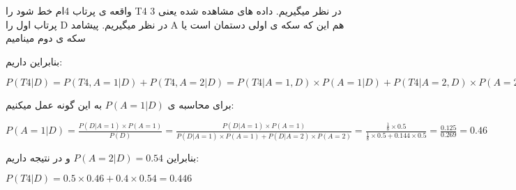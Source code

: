 واقعه ی پرتاب 4ام خط شود را T4 در نظر میگیریم. 
داده های مشاهده شده یعنی 3 پرتاب اول را D در نظر میگیریم. 
پیشامد A هم این که سکه ی اولی دستمان است یا سکه ی دوم مینامیم 

بنابراین داریم:

$P(T4|D) = P(T4, A=1|D) + P(T4, A=2|D) = 
P(T4|A=1, D) \times P(A=1|D) + P(T4|A=2, D) \times P(A=2|D) = 
0.5 \times P(A=1|D) + 0.4 \times P(A=2|D)$

برای محاسبه ی $P(A=1|D)$ به این گونه عمل میکنیم:

$P(A=1|D) = \frac{P(D|A=1) \times P(A=1)}{P(D)} = \frac{P(D|A=1) \times P(A=1)}{P(D|A=1) \times P(A=1) + P(D|A=2) \times P(A=2)} = 
\frac{\frac{1}{8} \times 0.5}{\frac{1}{8} \times 0.5 + 0.144 \times 0.5} = 
\frac{0.125}{0.269} = 0.46$

بنابراین 
$P(A=2|D) = 0.54$ 
و در نتیجه داریم:

$P(T4|D) = 0.5 \times 0.46 + 0.4 \times 0.54 = 0.446$